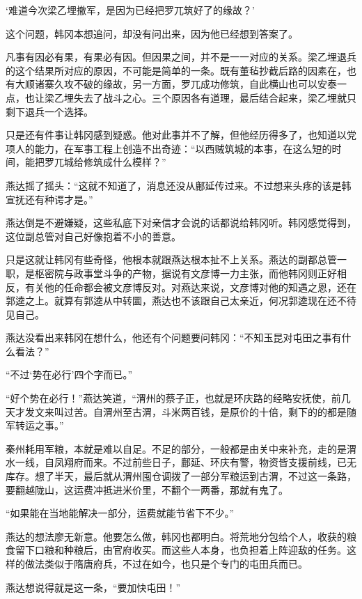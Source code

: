 ‘难道今次梁乙埋撤军，是因为已经把罗兀筑好了的缘故？’

这个问题，韩冈本想追问，却没有问出来，因为他已经想到答案了。

凡事有因必有果，有果必有因。但因果之间，并不是一一对应的关系。梁乙埋退兵的这个结果所对应的原因，不可能是简单的一条。既有董毡抄截后路的因素在，也有大顺诸寨久攻不破的缘故，另一方面，罗兀成功修筑，自此横山也可以安泰一点，也让梁乙埋失去了战斗之心。三个原因各有道理，最后结合起来，梁乙埋就只剩下退兵一个选择。

只是还有件事让韩冈感到疑惑。他对此事并不了解，但他经历得多了，也知道以党项人的能力，在军事工程上创造不出奇迹：“以西贼筑城的本事，在这么短的时间，能把罗兀城给修筑成什么模样？”

燕达摇了摇头：“这就不知道了，消息还没从鄜延传过来。不过想来头疼的该是韩宣抚还有种谔才是。”

燕达倒是不避嫌疑，这些私底下对亲信才会说的话都说给韩冈听。韩冈感觉得到，这位副总管对自己好像抱着不小的善意。

只是这就让韩冈有些奇怪，他根本就跟燕达根本扯不上关系。燕达的副都总管一职，是枢密院与政事堂斗争的产物，据说有文彦博一力主张，而他韩冈则正好相反，有关他的任命都会被文彦博反对。对燕达来说，文彦博对他的知遇之恩，还在郭逵之上。就算有郭逵从中转圜，燕达也不该跟自己太亲近，何况郭逵现在还不待见自己。

燕达没看出来韩冈在想什么，他还有个问题要问韩冈：“不知玉昆对屯田之事有什么看法？”

“不过‘势在必行’四个字而已。”

“好个势在必行！”燕达笑道，“渭州的蔡子正，也就是环庆路的经略安抚使，前几天才发文来叫过苦。自渭州至古渭，斗米两百钱，是原价的十倍，剩下的的都是随军转运之事。”

秦州耗用军粮，本就是难以自足。不足的部分，一般都是由关中来补充，走的是渭水一线，自凤翔府而来。不过前些日子，鄜延、环庆有警，物资皆支援前线，已无库存。想了半天，最后就从渭州囤仓调拨了一部分军粮运到古渭，不过这一条路，要翻越陇山，这运费冲抵进米价里，不翻个一两番，那就有鬼了。

“如果能在当地能解决一部分，运费就能节省下不少。”

燕达的想法廖无新意。他要怎么做，韩冈也都明白。将荒地分包给个人，收获的粮食留下口粮和种粮后，由官府收买。而这些人本身，也负担着上阵迎敌的任务。这样的做法类似于隋唐府兵，不过在如今，也只是个专门的屯田兵而已。

燕达想说得就是这一条，“要加快屯田！”

